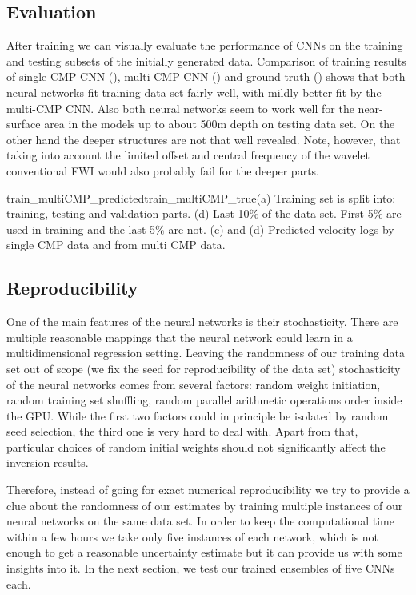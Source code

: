 \documentclass[manuscript]{geophysics}
\begin{document}

\subsection{Evaluation}
After training we can visually evaluate the performance of CNNs on the training and testing subsets of the initially generated data. Comparison of training results of single CMP CNN (), multi-CMP CNN () and ground truth () shows that both neural networks fit training data set fairly well, with mildly better fit by the multi-CMP CNN. Also both neural networks seem to work well for the near-surface area in the models up to about 500m depth on testing data set. On the other hand the deeper structures are not that well revealed. Note, however, that taking into account the limited offset and central frequency of the wavelet conventional FWI would also probably fail for the deeper parts. %

{train_multiCMP_predicted}{train_multiCMP_true}{(a) Training set is split into: training, testing and validation parts. (d) Last 10\% of the data set. First 5\% are used in training and the last 5\% are not. (c) and (d) Predicted velocity logs by single CMP data and from multi CMP data.}

\subsection{Reproducibility}
One of the main features of the neural networks is their stochasticity. There are multiple reasonable mappings that the neural network could learn in a multidimensional regression setting. Leaving the randomness of our training data set out of scope (we fix the seed for reproducibility of the data set) stochasticity of the neural networks comes from several factors: random weight initiation, random training set shuffling, random parallel arithmetic operations order inside the GPU. While the first two factors could in principle be isolated by random seed selection, the third one is very hard to deal with. Apart from that, particular choices of random initial weights should not significantly affect the inversion results.

Therefore, instead of going for exact numerical reproducibility we try to provide a clue about the randomness of our estimates by training multiple instances of our neural networks on the same data set. In order to keep the computational time within a few hours we take only five instances of each network, which is not enough to get a reasonable uncertainty estimate but it can provide us with some insights into it. In the next section, we test our trained ensembles of five CNNs each.
\end{document}
